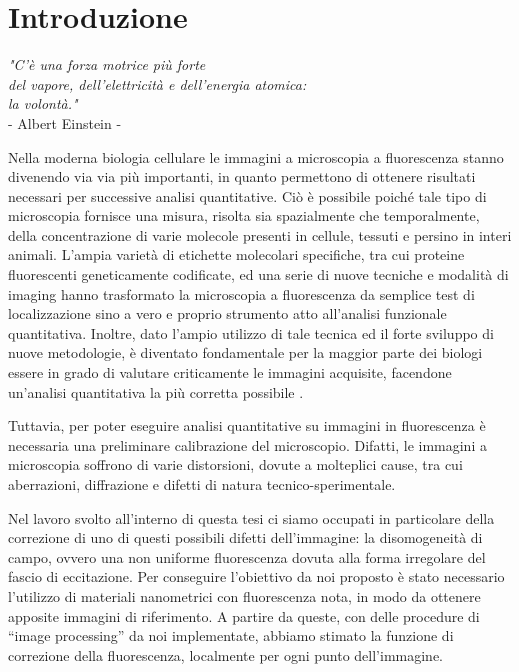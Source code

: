 \clearpage{\pagestyle{empty}\cleardoublepage}

\chapter*{Introduzione} 

\begin{flushright}\begin{small}\textit{"C'è una forza motrice più forte\\ del vapore, dell'elettricità e dell'energia atomica:\\ la volontà."}\\
- Albert Einstein -\\
\end{small}\end{flushright}

Nella moderna biologia cellulare le immagini a microscopia a fluorescenza stanno divenendo via via più importanti, in quanto permettono di ottenere risultati necessari per successive analisi quantitative.
Ciò è possibile poiché tale tipo di microscopia fornisce una misura, risolta sia spazialmente che temporalmente, della concentrazione di varie molecole presenti in cellule, tessuti e persino in interi animali. 
L'ampia varietà di etichette molecolari specifiche, tra cui proteine fluorescenti geneticamente codificate, ed una serie di nuove tecniche e modalità di imaging hanno trasformato la microscopia a fluorescenza da semplice test di localizzazione sino a vero e proprio strumento atto all'analisi funzionale quantitativa.
Inoltre, dato l'ampio utilizzo di tale tecnica ed il forte sviluppo di nuove metodologie, è diventato fondamentale per la maggior parte dei biologi essere in grado di valutare criticamente le immagini acquisite, facendone un'analisi quantitativa la più corretta possibile \cite{fluo}.

Tuttavia, per poter eseguire analisi quantitative su immagini in fluorescenza è necessaria una preliminare calibrazione del microscopio.
Difatti, le immagini a microscopia soffrono di varie distorsioni, dovute a molteplici cause, tra cui aberrazioni, diffrazione e difetti di natura tecnico-sperimentale.

Nel lavoro svolto all'interno di questa tesi ci siamo occupati in particolare della correzione di uno di questi possibili difetti dell'immagine: la disomogeneità di campo, ovvero una non uniforme fluorescenza dovuta alla forma irregolare del fascio di eccitazione. 
Per conseguire l'obiettivo da noi proposto è stato necessario l'utilizzo di materiali nanometrici con fluorescenza nota, in modo da ottenere apposite immagini di riferimento. 
A partire da queste, con delle procedure di ``image processing'' da noi implementate, abbiamo stimato la funzione di correzione della fluorescenza, localmente per ogni punto dell'immagine.

